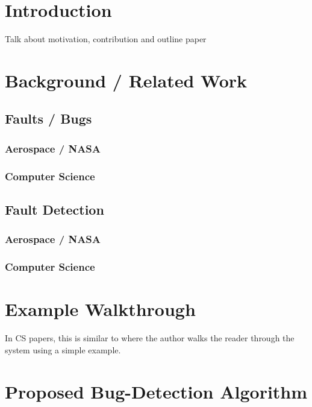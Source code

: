 \section{Introduction}

Talk about motivation, contribution and outline paper 


\section{Background / Related Work}


\subsection{Faults / Bugs}
\subsubsection{Aerospace / NASA}
\subsubsection{Computer Science}

\subsection{Fault Detection}
\subsubsection{Aerospace / NASA}
\subsubsection{Computer Science}

\section{Example Walkthrough}
In CS papers, this is similar to where the author walks the
reader through the system using a simple example.


\section{Proposed Bug-Detection Algorithm}

